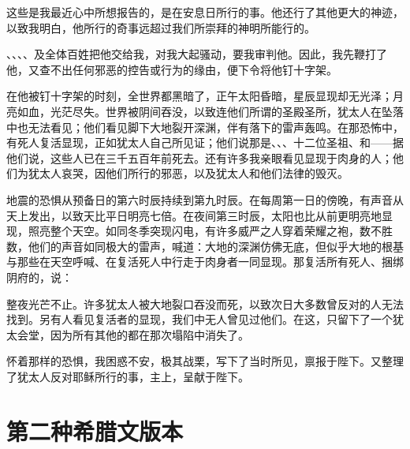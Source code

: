 这些是我最近心中所想报告的，是在安息日所行的事。他还行了其他更大的神迹，以致我明白，他所行的奇事远超过我们所崇拜的神明所能行的。\par

、、、、及全体百姓把他交给我，对我大起骚动，要我审判他。因此，我先鞭打了他，又查不出任何邪恶的控告或行为的缘由，便下令将他钉十字架。\par

在他被钉十字架的时刻，全世界都黑暗了，正午太阳昏暗，星辰显现却无光泽；月亮如血，光茫尽失。世界被阴间吞没，以致连他们所谓的圣殿圣所，犹太人在坠落中也无法看见；他们看见脚下大地裂开深渊，伴有落下的雷声轰鸣。在那恐怖中，有死人复活显现，正如犹太人自己所见证；他们说那是、、、十二位圣祖、和——据他们说，这些人已在三千五百年前死去。还有许多我亲眼看见显现于肉身的人；他们为犹太人哀哭，因他们所行的邪恶，以及犹太人和他们法律的毁灭。\par

地震的恐惧从预备日的第六时辰持续到第九时辰。在每周第一日的傍晚，有声音从天上发出，以致天比平日明亮七倍。在夜间第三时辰，太阳也比从前更明亮地显现，照亮整个天空。如同冬季突现闪电，有许多威严之人穿着荣耀之袍，数不胜数，他们的声音如同极大的雷声，喊道：大地的深渊仿佛无底，但似乎大地的根基与那些在天空呼喊、在复活死人中行走于肉身者一同显现。那复活所有死人、捆绑阴府的，说：\par

整夜光芒不止。许多犹太人被大地裂口吞没而死，以致次日大多数曾反对的人无法找到。另有人看见复活者的显现，我们中无人曾见过他们。在这，只留下了一个犹太会堂，因为所有其他的都在那次塌陷中消失了。\par

怀着那样的恐惧，我困惑不安，极其战栗，写下了当时所见，禀报于陛下。又整理了犹太人反对耶稣所行的事，主上，呈献于陛下。\par


\section{第二种希腊文版本}

